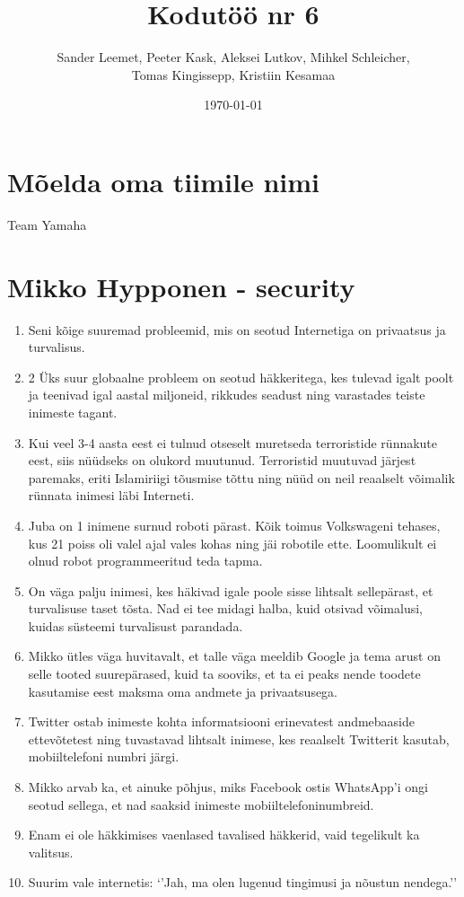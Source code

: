 \documentclass{article}
\title{Kodutöö nr 6}
\author{Sander Leemet, Peeter Kask, Aleksei Lutkov, Mihkel Schleicher,\\ Tomas Kingissepp, Kristiin Kesamaa}
\date{\today}
\begin{document}
\maketitle

\section{Mõelda oma tiimile nimi}
Team Yamaha

\section{Mikko Hypponen - security}
\begin{enumerate}
	\item{Seni kõige suuremad probleemid, mis on seotud Internetiga on privaatsus ja turvalisus.}
	\item{2 Üks suur globaalne probleem on seotud häkkeritega, kes tulevad igalt poolt ja teenivad igal aastal miljoneid, rikkudes seadust ning varastades teiste inimeste tagant.}
	\item{Kui veel 3-4 aasta eest ei tulnud otseselt muretseda terroristide rünnakute eest, siis nüüdseks on olukord muutunud. Terroristid muutuvad järjest paremaks, eriti Islamiriigi tõusmise tõttu ning nüüd on neil reaalselt võimalik rünnata inimesi läbi Interneti.}
	\item{Juba on 1 inimene surnud roboti pärast. Kõik toimus Volkswageni tehases, kus 21 poiss oli valel ajal vales kohas ning jäi robotile ette. Loomulikult ei olnud robot programmeeritud teda tapma.}
	\item{On väga palju inimesi, kes häkivad igale poole sisse lihtsalt sellepärast, et turvalisuse taset tõsta. Nad ei tee midagi halba, kuid otsivad võimalusi, kuidas süsteemi turvalisust parandada.}
	\item{Mikko ütles väga huvitavalt, et talle väga meeldib Google ja tema arust on selle tooted suurepärased, kuid ta sooviks, et ta ei peaks nende toodete kasutamise eest maksma oma andmete ja privaatsusega.}
	\item{Twitter ostab inimeste kohta informatsiooni erinevatest andmebaaside ettevõtetest ning tuvastavad lihtsalt inimese, kes reaalselt Twitterit kasutab, mobiiltelefoni numbri järgi.}
	\item{Mikko arvab ka, et ainuke põhjus, miks Facebook ostis WhatsApp’i ongi seotud sellega, et nad saaksid inimeste mobiiltelefoninumbreid.}
	\item{Enam ei ole häkkimises vaenlased tavalised häkkerid, vaid tegelikult ka valitsus.}
	\item{Suurim vale internetis: ‘’Jah, ma olen lugenud tingimusi ja nõustun nendega.’’}
\end{enumerate}
\end{document}
